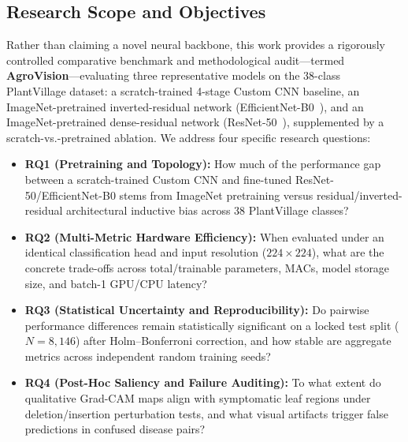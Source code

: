 \documentclass[journal]{IEEEtran}
\begin{document}
\subsection{Research Scope and Objectives}
Rather than claiming a novel neural backbone, this work provides a rigorously controlled comparative benchmark and methodological audit---termed \textbf{AgroVision}---evaluating three representative models on the 38-class PlantVillage dataset: a scratch-trained 4-stage Custom CNN baseline, an ImageNet-pretrained inverted-residual network (EfficientNet-B0~\cite{tan2019}), and an ImageNet-pretrained dense-residual network (ResNet-50~\cite{he2016}), supplemented by a scratch-vs.-pretrained ablation. We address four specific research questions:
\begin{itemize}
    \item \textbf{RQ1 (Pretraining and Topology):} How much of the performance gap between a scratch-trained Custom CNN and fine-tuned ResNet-50/EfficientNet-B0 stems from ImageNet pretraining versus residual/inverted-residual architectural inductive bias across 38 PlantVillage classes?
    \item \textbf{RQ2 (Multi-Metric Hardware Efficiency):} When evaluated under an identical classification head and input resolution ($224 \times 224$), what are the concrete trade-offs across total/trainable parameters, MACs, model storage size, and batch-1 GPU/CPU latency?
    \item \textbf{RQ3 (Statistical Uncertainty and Reproducibility):} Do pairwise performance differences remain statistically significant on a locked test split ($N=8,146$) after Holm--Bonferroni correction, and how stable are aggregate metrics across independent random training seeds?
    \item \textbf{RQ4 (Post-Hoc Saliency and Failure Auditing):} To what extent do qualitative Grad-CAM maps align with symptomatic leaf regions under deletion/insertion perturbation tests, and what visual artifacts trigger false predictions in confused disease pairs?
\end{itemize}
\end{document}
